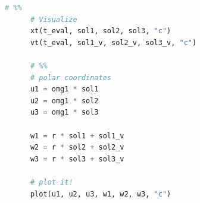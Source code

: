 \documentclass[12pt]{article}
\begin{document}
\begin{lstlisting}[language={Python}]
      # %%
      # Visualize
      xt(t_eval, sol1, sol2, sol3, "c")
      vt(t_eval, sol1_v, sol2_v, sol3_v, "c")

      # %%
      # polar coordinates
      u1 = omg1 * sol1
      u2 = omg1 * sol2
      u3 = omg1 * sol3

      w1 = r * sol1 + sol1_v
      w2 = r * sol2 + sol2_v
      w3 = r * sol3 + sol3_v

      # plot it!
      plot(u1, u2, u3, w1, w2, w3, "c")
      \end{lstlisting}
      
\end{document}
